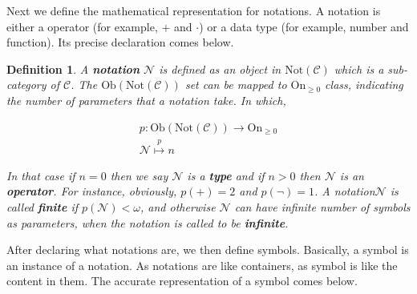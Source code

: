 \documentclass{aims}
\newtheorem{definition}{Definition}	%
\numberwithin{theorem}{section}	%
\numberwithin{axiom}{section}	%
\numberwithin{definition}{section}	%
\begin{document}
Next we define the mathematical representation for notations. A notation is either a operator (for example, \(+\) and \(\cdot\)) or a data type (for example, number and function). Its precise declaration comes below.

\begin{definition}
	A \textbf{ notation} \(\mathcal{N}\) is defined as an object in \(\text{Not}(\mathcal{C})\) which is a sub-category of \(\mathcal{C}\). The \(\text{Ob}(\text{Not}(\mathcal{C}))\) set can be mapped to \(\text{On}_{\geq 0}\) class, indicating the number of parameters that a notation take. In which,
	
	\begin{equation}
		\begin{gathered}
			\mathit{p}:\text{Ob}(\text{Not}(\mathcal{C}))\to \text{On}_{\geq 0}\\
			\mathcal{N}\overset{\mathit{p}}{\mapsto}n
		\end{gathered}
	\end{equation}
	
	In that case if \(n=0\) then we say \(\mathcal{N}\) is a \textbf{ type} and if \(n>0\) then \(\mathcal{N}\) is an \textbf{ operator}. For instance, obviously, \(\mathit{p}(+)=2\) and \(\mathit{p}(\neg )=1\). A notation\(\mathcal{N}\) is called \textbf{ finite} if \(\mathit{p}(\mathcal{N})<\omega\), and otherwise \(\mathcal{N}\) can have infinite number of symbols as parameters, when the notation is called to be \textbf{ infinite}.
\end{definition}

After declaring what notations are, we then define symbols. Basically, a symbol is an instance of a notation. As notations are like containers, as symbol is like the content in them. The accurate representation of a symbol comes below.
\end{document}
